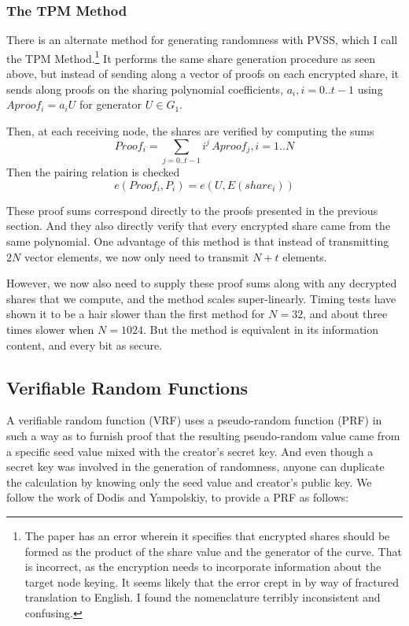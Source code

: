 \documentclass{yellowpaper}
\begin{document}

\subsubsection{The TPM Method}
There is an alternate method for generating randomness with PVSS, which I call the TPM Method.\cite{tpm}\footnote{The paper has an error wherein it specifies that encrypted shares should be formed as the product of the share value and the generator of the curve. That is incorrect, as the encryption needs to incorporate information about the target node keying. It seems likely that the error crept in by way of fractured translation to English. I found the nomenclature terribly inconsistent and confusing.} It performs the same share generation procedure as seen above, but instead of sending along a vector of proofs on each encrypted share, it sends along proofs on the sharing polynomial coefficients, $a_i, i = 0..t-1$ using $Aproof_i = a_i U$ for generator $U \in G_1$.

Then, at each receiving node, the shares are verified by computing the sums
$$ Proof_i = \sum_{j=0..t-1} i^j\, Aproof_j, i = 1..N$$
Then the pairing relation is checked
$$e(Proof_i, P_i) = e(U,E(share_i))$$

These proof sums correspond directly to the proofs presented in the previous section. And they also directly verify that every encrypted share came from the same polynomial. One advantage of this method is that instead of transmitting $2 N$ vector elements, we now only need to transmit $N+t$ elements.

However, we now also need to supply these proof sums along with any decrypted shares that we compute, and the method scales super-linearly. Timing tests have shown it to be a hair slower than the first method for $N=32$, and about three times slower when $N=1024$. But the method is equivalent in its information content, and every bit as secure.
\subsection{Verifiable Random Functions}
A verifiable random function (VRF)\cite{vrf2} uses a pseudo-random function (PRF) in such a way as to furnish proof that the resulting pseudo-random value came from a specific seed value mixed with the creator's secret key. And even though a secret key was involved in the generation of randomness, anyone can duplicate the calculation by knowing only the seed value and creator's public key. We follow the work of Dodis and Yampolskiy\cite{vrf}, to provide a PRF as follows:
\end{document}
